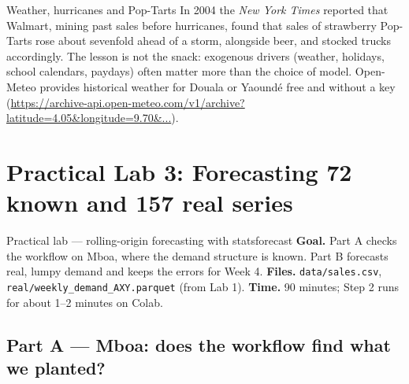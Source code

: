 \begin{realcase}{Weather, hurricanes and Pop-Tarts}
In 2004 the \emph{New York Times} reported that Walmart, mining past sales before hurricanes, found that sales of
strawberry Pop-Tarts rose about sevenfold ahead of a storm, alongside beer, and stocked trucks accordingly. The lesson
is not the snack: exogenous drivers (weather, holidays, school calendars, paydays) often matter more than the choice of
model. Open-Meteo provides historical weather for Douala or Yaoundé free and without a key
(\url{https://archive-api.open-meteo.com/v1/archive?latitude=4.05&longitude=9.70&...}).
\end{realcase}

\section{Practical Lab 3: Forecasting 72 known and 157 real series}
\begin{labbox}{Practical lab --- rolling-origin forecasting with statsforecast}
\textbf{Goal.} Part A checks the workflow on Mboa, where the demand structure is known. Part B forecasts real, lumpy
demand and keeps the errors for Week 4. \textbf{Files.} \texttt{data/sales.csv},
\texttt{real/weekly\_demand\_AXY.parquet} (from Lab 1). \textbf{Time.} 90 minutes; Step 2 runs for about
1--2 minutes on Colab.
\end{labbox}

\subsection*{Part A --- Mboa: does the workflow find what we planted?}


